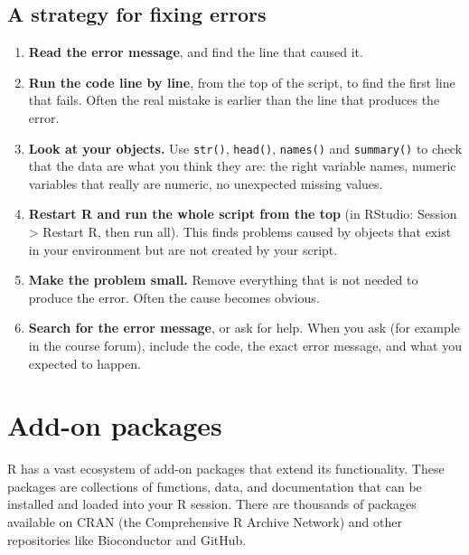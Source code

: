 \documentclass[
  letterpaper,
  8pt,
  a4paper]{book}
\providecommand{\tightlist}{%
  \setlength{\itemsep}{0pt}\setlength{\parskip}{0pt}}
\begin{document}
\subsection*{A strategy for fixing
errors}\label{a-strategy-for-fixing-errors}

\begin{enumerate}
\def\labelenumi{\arabic{enumi}.}
\tightlist
\item
  \textbf{Read the error message}, and find the line that caused it.
\item
  \textbf{Run the code line by line}, from the top of the script, to
  find the first line that fails. Often the real mistake is earlier than
  the line that produces the error.
\item
  \textbf{Look at your objects.} Use \texttt{str()}, \texttt{head()},
  \texttt{names()} and \texttt{summary()} to check that the data are
  what you think they are: the right variable names, numeric variables
  that really are numeric, no unexpected missing values.
\item
  \textbf{Restart R and run the whole script from the top} (in RStudio:
  Session \textgreater{} Restart R, then run all). This finds problems
  caused by objects that exist in your environment but are not created
  by your script.
\item
  \textbf{Make the problem small.} Remove everything that is not needed
  to produce the error. Often the cause becomes obvious.
\item
  \textbf{Search for the error message}, or ask for help. When you ask
  (for example in the course forum), include the code, the exact error
  message, and what you expected to happen.
\end{enumerate}

\section*{Add-on packages}\label{add-on-packages}


R has a vast ecosystem of add-on packages that extend its functionality.
These packages are collections of functions, data, and documentation
that can be installed and loaded into your R session. There are
thousands of packages available on CRAN (the Comprehensive R Archive
Network) and other repositories like Bioconductor and GitHub.
\end{document}
